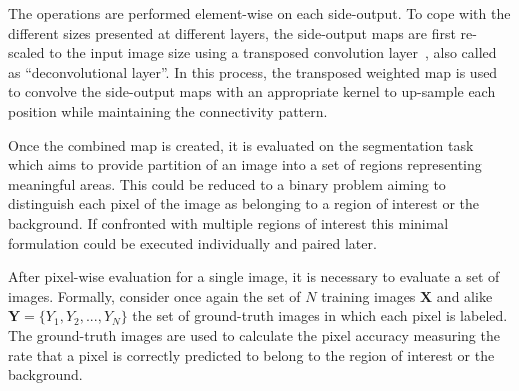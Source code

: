 The operations are performed element-wise on each side-output. To cope with the different sizes presented at different layers, the side-output maps are first re-scaled to the input image size using a transposed convolution layer~\cite{dumoulin2016}, also called as ``deconvolutional layer''. In this process, the transposed weighted map is used to convolve the side-output maps with an appropriate kernel to up-sample each position while maintaining the connectivity pattern. 

Once the combined map is created, it is evaluated on the segmentation task which aims to provide partition of an image into a set of regions representing meaningful areas. This could be reduced to a binary problem aiming to distinguish each pixel of the image as belonging to a region of interest or the background. If confronted with multiple regions of interest this minimal formulation could be executed individually and paired later.


{\color{red}After pixel-wise evaluation for a single image, it is necessary to evaluate a set of images. Formally, consider once again the set of $N$ training images $\mathbf{X}$ and alike $\mathbf{Y}=\{Y_1, Y_2,...,Y_N\}$ the set of ground-truth images in which each pixel is labeled.  The ground-truth images are used to calculate the pixel accuracy measuring the rate that a pixel is correctly predicted to belong to the region of interest or the background.}


%

